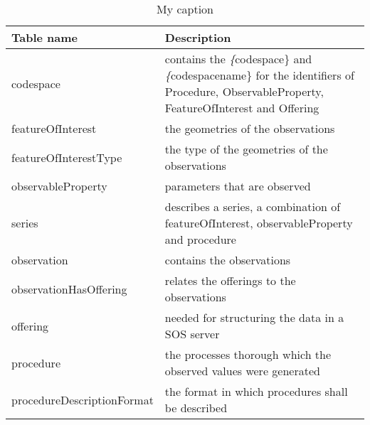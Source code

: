 \begin{table}[]
\centering
\caption{My caption}
\label{my-label}
\begin{tabular}{@{}ll@{}}
\toprule
Table name                 & Description                                                                                                                                                \\ \midrule
codespace                  & contains the \textit\{codespace\} and \textit\{codespacename\} for the identifiers of Procedure, ObservableProperty, FeatureOfInterest and Offering        \\
featureOfInterest          & the geometries of the observations                                                                                                                         \\
featureOfInterestType      & the type of the geometries of the observations                                                                                                             \\
observableProperty         & parameters that are observed                                                                                                                               \\
series                     & describes a series, a combination of featureOfInterest, observableProperty and procedure                                                                   \\
observation                & contains the observations                                                                                                                                  \\
observationHasOffering     & relates the offerings to the observations                                                                                                                  \\
offering                   & needed for structuring the data in a SOS server                                                                                                            \\
procedure                  & the processes thorough which the observed values were generated                                                                                            \\
procedureDescriptionFormat & the format in which procedures shall be described                                                                                                          \\

\end{tabular}
\end{table}
